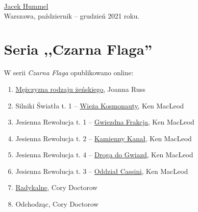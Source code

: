 \documentclass[oneside,polish,11pt,sfheadings]{mwbk}
\begin{document}
\href{mailto:theskymyladythesky@zoho.eu}{Jacek Hummel}\\

Warszawa, październik -- grudzień 2021 roku.


\chapter*{Seria ,,Czarna Flaga''}

\begin{center}
\begin{large}
W serii \textit{Czarna Flaga} opublikowano online:
\end{large} 
\end{center}


\begin{enumerate}
\item \href{https://archive.org/details/joanna-russ-mezczyzna-rodzaju-zenskiego/Joanna_Russ_M\%C4\%99\%C5\%BCczyzna_rodzaju_\%C5\%BCe\%C5\%84skiego}{Mężczyzna rodzaju żeńskiego}, Joanna Russ
\item Silniki Światła t. 1 -- \href{https://archive.org/details/ken-macleod-wieza-kosmonauty}{Wieża Kosmonauty}, Ken MacLeod
\item Jesienna Rewolucja t. 1 -- \href{https://archive.org/details/ken-mac-leod-jesienna-rewolucja-gwiezdna-frakcja}{Gwiezdna Frakcja}, Ken MacLeod
\item Jesienna Rewolucja t. 2 -- \href{https://archive.org/details/ken-mac-leod-jesienna-rewolucja-kamienny-kanal}{Kamienny Kanał}, Ken MacLeod
\item Jesienna Rewolucja t. 4 --  \href{https://archive.org/details/ken-mac-leod-jesienna-rewolucja-droga-do-gwiazd}{Droga do Gwiazd}, Ken MacLeod
\item Jesienna Rewolucja t. 3 -- \href{https://archive.org/details/ken-mac-leod-jesienna-rewolucja-oddzial-cassini}{Oddział Cassini}, Ken MacLeod
\item \href{https://archive.org/details/cory-doctorow-radykalne}{Radykalne}, Cory Doctorow
\item Odchodząc, Cory Doctorow
\end{enumerate}

\newpage
\end{document}
